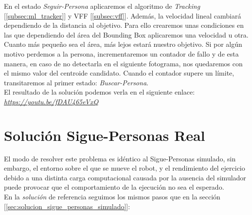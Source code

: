 En el estado \textit{Seguir-Persona} aplicaremos el algoritmo de \textit{Tracking} [\ref{subsec:ml_tracker}] y VFF [\ref{subsec:vff}]. Además, la velocidad lineal cambiará dependiendo de la distancia al objetivo. Para ello crearemos unas condiciones en las que dependiendo del área del Bounding Box aplicaremos una velocidad u otra. Cuanto más pequeño sea el área, más lejos estará nuestro objetivo. Si por algún motivo perdemos a la persona, incrementaremos un contador de fallo y de esta manera, en caso de no detectarla en el siguiente fotograma, nos quedaremos con el mismo valor del centroide candidato. Cuando el contador supere un límite, transitaremos al primer estado: \textit{Buscar-Persona}.\\

El resultado de la solución podemos verla en el siguiente enlace:\\ \textit{\url{https://youtu.be/fDAU465eVxQ}}\\


\section{Solución Sigue-Personas Real}
\label{sec:solucion_sigue_personas_real}

El modo de resolver este problema es idéntico al Sigue-Personas simulado, sin embargo, el entorno sobre el que se mueve el robot, y el rendimiento del ejercicio debido a una distinta carga computacional causada por la ausencia del simulador puede provocar que el comportamiento de la ejecución no sea el esperado.\\

En la \textit{solución} de referencia seguimos los mismos pasos que en la sección [\ref{sec:solucion_sigue_personas_simulado}]:\\

